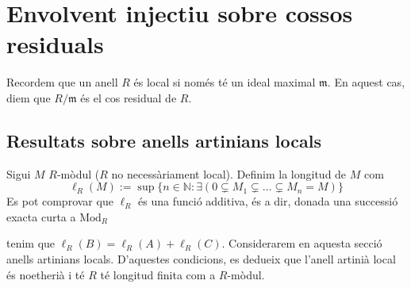 \section{Envolvent injectiu sobre cossos residuals}
Recordem que un anell $R$ és local si només té un ideal maximal $\mathfrak{m}$. En aquest cas, diem que $R/\mathfrak{m}$ és el cos residual de $R$.
\subsection{Resultats sobre anells artinians locals}
Sigui $M$ $R$-mòdul ($R$ no necessàriament local). Definim la longitud de $M$ com
\begin{equation*}
    \ell_{R}(M):=\sup\{n\in\mathbb{N}:\exists(0\subsetneq M_{1}\subsetneq\ldots\subsetneq M_{n}=M)\}
\end{equation*}
Es pot comprovar que $\ell_{R}$ és una funció additiva, és a dir, donada una successió exacta curta a $\textrm{Mod}_{R}$
\begin{center}
\end{center}
tenim que $\ell_{R}(B)=\ell_{R}(A)+\ell_{R}(C)$.\newline
Considerarem en aquesta secció anells artinians locals. D'aquestes condicions, es dedueix que l'anell artinià local és noetherià i té $R$ té longitud finita com a $R$-mòdul.
